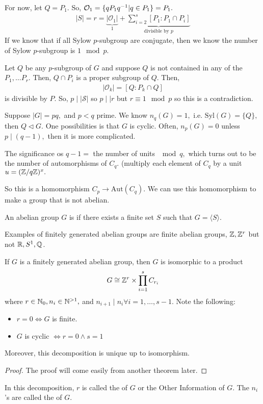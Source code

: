\documentclass[a4paper]{article}
\begin{document}
For now, let $Q=P_1.$ So, $\mathcal O_1=\{qP_1q^{-1}|q\in P_1\}=P_1.$ \begin{align}
    |S|=r=\underbrace{|\mathcal O_1|}_{1}+\underbrace{\sum_{i=2}^s[P_1:P_1\cap P_i]}_{\text{divisible by }p}
\end{align}
If we know that if all Sylow $p$-subgroup are conjugate, then we know the number of Sylow $p$-subgroup is $1\mod p.$

Let $Q$ be any $p$-subgroup of $G$ and suppose $Q$ is not contained in any of the $P_1,\dots P_r.$ Then, $Q\cap P_i$ is a proper subgroup of $Q.$ Then, \begin{align}
    |\mathcal O_k|=[Q:P_k\cap Q]
\end{align}
is divisible by $P.$ So, $p\mid|\mathcal S|$ so $p\mid|r$ but $r\equiv 1\mod p$ so this is a contradiction. 


Suppose $|G|=pq,$ and $p<q$ prime. We know $n_q(G)=1,$ i.e. $\mathrm{Syl}(G)=\{Q\},$ then $Q\triangleleft G.$ One possibilities is that $G$ is cyclic. Often, $n_p(G)=0$ unless $p\mid(q-1),$ then it is more complicated.

The significance os $q-1=$ the number of units $\mod q,$ which turns out to be the number of automorphisms of $C_q.$ (multiply each element of $C_q$ by a unit $u=(\mathbb{Z}/q\mathbb{Z})^x.$

So this is a homomorphism $C_p\to\mathrm{Aut}(C_q).$ We can use this homomorphism to make a group that is not abelian.

\begin{definition}
    An abelian group $G$ is  if there exists a finite set $S$ such that $G=\langle S\rangle.$
\end{definition}
Examples of finitely generated abelian groups are finite abelian groups, $\mathbb{Z},\mathbb{Z}^r$ but not $\mathbb{R},S^1,\mathbb Q$.
\begin{theorem}
    If $G$ is a finitely generated abelian group, then $G$ is isomorphic to a product \begin{align}
        G\cong\mathbb{Z}^r\times\prod_{i=1}^sC_{r_i}
    \end{align}
    where $r\in\mathbb{N}_0,n_i\in\mathbb{N}^{>1},$ and $n_{i+1}\mid n_i\forall i=1,\dots,s-1.$ Note the following:\begin{itemize}
        \item $r=0\iff G$ is finite.
        \item $G$ is cyclic $\iff r=0\land s=1$
    \end{itemize}
    Moreover, this decomposition is unique up to isomorphism.
    \begin{proof}
        The proof will come easily from another theorem later.
    \end{proof}
\end{theorem}
\begin{definition}
    In this decomposition, $r$ is called the  of $G$ or the Other Information of $G.$ The $n_i$'s are called the  of $G.$
\end{definition}
\end{document}
